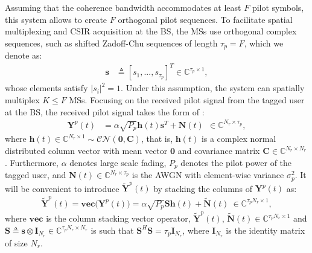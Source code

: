 \documentclass[conference, a4paper, 10pt]{IEEEtran}
\newcommand{\mx}[1]{\mathbf{#1}}
\begin{document}
Assuming that the coherence bandwidth accommodates at least $F$ pilot symbols,
this system allows to create $F$ orthogonal pilot sequences.
To facilitate spatial multiplexing
and \ac{CSIR} acquisition at the \ac{BS}, the \acp{MS} use orthogonal complex
sequences, such as shifted Zadoff-Chu sequences of length $\tau_p=F$, which we denote as:
\begin{align}
\mathbf{s} &\triangleq \left[s_1,...,s_{\tau_p}\right]^T \in \mathds{C}^{{\tau_p \times 1}},
\end{align}
whose elements satisfy %
$|s_i|^2 = 1$. %
Under this assumption, the system can spatially multiplex $K\leq F$ \acp{MS}.
Focusing on the received pilot signal from the tagged user at the \ac{BS},
the received pilot signal takes the form of \cite{Fodor:21}:
\begin{align}
\mathbf{Y}^p(t)
&=
\alpha \sqrt{P_{p}}\mathbf{h}(t) \mathbf{s}^T +\mathbf{N}(t) ~~ \in \mathds{C}^{N_r \times \tau_p},
\label{eqn:received_training_seq}
\end{align}
where %
$\mathbf{h}(t) \in \mathds{C}^{N_r \times 1} \sim \mathcal{CN}(\mathbf{0},\mathbf{C})$, that is,
$\mathbf{h}(t)$ is a %
complex normal distributed column vector
with mean vector $\mathbf{0}$ and covariance matrix $\mx{C} \in \mathds{C}^{N_r \times N_r}$. %
Furthermore, $\alpha$ denotes
large scale fading, $P_p$ denotes the pilot power of the tagged user,
and $\mathbf{N}(t)\in \mathds{C}^{N_r \times \tau_p}$
is the %
\ac{AWGN} with element-wise variance $\sigma_p^2$.
It will be convenient to introduce $\mathbf{\tilde Y}^p(t)$ by stacking the columns of  $\mathbf{Y}^p(t)$ as:
\begin{align}
\mathbf{\tilde Y}^p(t)=\textbf{vec}\big(\mathbf{Y}^p(t)\big)=\alpha\sqrt{P_p} \mathbf{S} \mathbf{h}(t) +\mathbf{\tilde N}(t) ~\in \mathds{C}^{\tau_p N_r \times 1},
\label{eqn:received_training_seq2}
\end{align}
where $\textbf{vec}$ is the column stacking vector operator,
$\mathbf{\tilde Y}^p(t)$, $\mathbf{\tilde N}(t) \in \mathds{C}^{\tau_p N_r \times 1}$
and
$\mathbf{S} \triangleq \mathbf{s}\otimes \mathbf{I}_{N_r} \in \mathds{C}^{\tau_p N_r \times N_r}$
is such that $\mathbf{S}^H\mathbf{S}=\tau_p\mathbf{I}_{N_r}$,
where $\mathbf{I}_{N_r}$ is the identity matrix of size $N_r$.
\vspace{-2mm}
\end{document}
